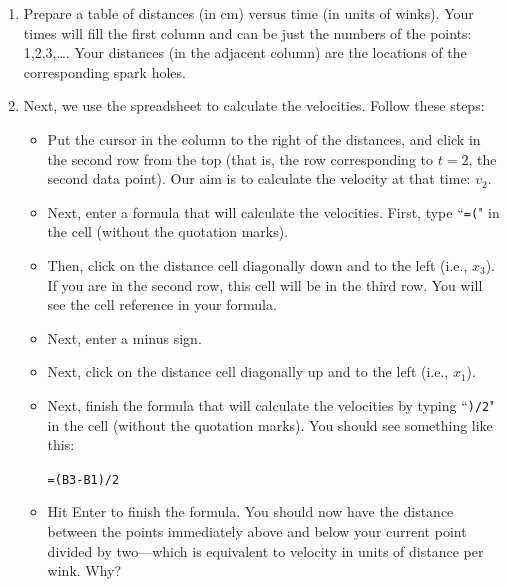\begin{enumerate}

\item Prepare a table of distances (in cm)
versus time (in units of winks).  Your times will fill the first column
and can be just the numbers
of the points: 1,2,3,\ldots . Your
distances (in the adjacent column) are the locations of the corresponding
spark holes.


\item  Next, we use the
spreadsheet to calculate the velocities.  Follow these steps:
%
\begin{itemize}
\item  Put the cursor in the column to the right of the distances,
and click in the second row from the top (that is, the row corresponding
to $t=2$, the second data point).  Our aim is to calculate the
velocity at  that time: $v_2$.

\item  Next, enter a formula that will calculate the velocities.
First, type  ``{\tt =(}"  in the cell (without the quotation marks).

\item  Then, click on the distance cell diagonally down and to the
left (i.e., $x_3$).  If you are in the second row, this cell will be in the third
row.  You will see the cell reference in your formula.

\item  Next, enter a minus sign.

\item  Next, click on the distance cell diagonally up and to the left (i.e., $x_1$).

\item  Next, finish the formula that will calculate the velocities by
typing  ``{\tt )/2}"  in the cell (without the quotation marks).
You should see something like this:

{\tt =(B3-B1)/2}

\item  Hit Enter to finish the formula.  You should now have the
distance between the points immediately above and below your current
point divided by two---which is equivalent to velocity in units of 
distance per wink. Why?


\end{itemize}
\end{enumerate}
